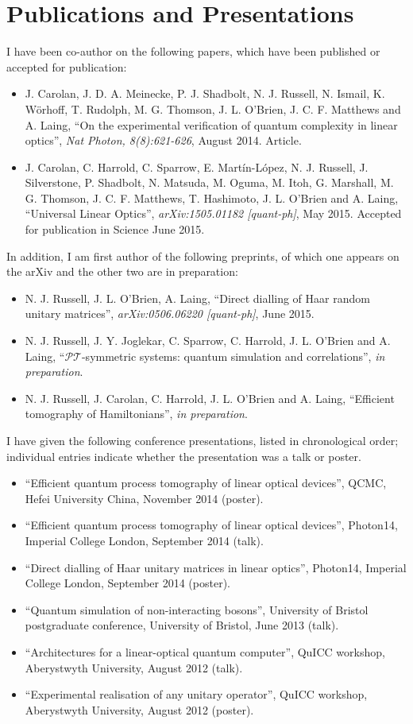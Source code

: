 \chapter{Publications and Presentations}
I have been co-author on the following papers, which have been published or
accepted for publication:
\begin{itemize}
  \item J. Carolan, J. D. A. Meinecke, P. J. Shadbolt, N. J. Russell, N. Ismail,
    K. W\"orhoff, T. Rudolph, M. G. Thomson, J. L. O'Brien, J. C. F. Matthews
    and A. Laing, ``On the experimental verification of quantum complexity in
    linear optics'', \textit{Nat Photon, 8(8):621-626}, August 2014. Article.
  \item J. Carolan, C. Harrold, C. Sparrow, E. Mart\'in-L\'opez, N. J. Russell,
    J. Silverstone, P. Shadbolt, N. Matsuda, M. Oguma, M. Itoh, G. Marshall, M.
    G. Thomson, J. C. F. Matthews, T. Hashimoto, J. L. O'Brien and A. Laing,
    ``Universal Linear Optics'', \textit{arXiv:1505.01182 [quant-ph]}, May 2015.
    Accepted for publication in Science June 2015.
\end{itemize}
In addition, I am first author of the following preprints, of which one appears
on the arXiv and the other two are in preparation:
\begin{itemize}
  \item N. J. Russell, J. L. O'Brien, A. Laing, ``Direct dialling of Haar random
    unitary matrices'', \textit{arXiv:0506.06220 [quant-ph]}, June 2015.
  \item N. J. Russell, J. Y. Joglekar, C. Sparrow, C. Harrold, J. L. O'Brien and
    A. Laing, ``\(\mathcal{PT}\)-symmetric systems: quantum simulation and
    correlations'', \textit{in preparation}.
  \item N. J. Russell, J. Carolan, C. Harrold, J. L. O'Brien and A. Laing,
    ``Efficient tomography of Hamiltonians'', \textit{in preparation}.
\end{itemize}
I have given the following conference presentations, listed in chronological
order; individual entries indicate whether the presentation was a talk or
poster.
\begin{itemize}
  \item ``Efficient quantum process tomography of linear optical devices'',
    QCMC, Hefei University China, November 2014 (poster).
  \item ``Efficient quantum process tomography of linear optical devices'',
    Photon14, Imperial College London, September 2014 (talk).
  \item ``Direct dialling of Haar unitary matrices in linear optics'', Photon14,
    Imperial College London, September 2014 (poster).
  \item ``Quantum simulation of non-interacting bosons'', University of Bristol
    postgraduate conference, University of Bristol, June 2013 (talk).
  \item ``Architectures for a linear-optical quantum computer'', QuICC workshop,
    Aberystwyth University, August 2012 (talk).
  \item ``Experimental realisation of any unitary operator'', QuICC workshop,
    Aberystwyth University, August 2012 (poster).
\end{itemize}
